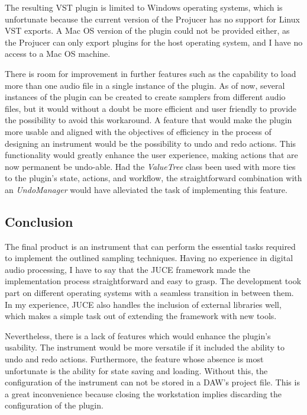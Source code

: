 \documentclass[12pt, a4paper, hidelinks]{article}
\begin{document}
	The resulting VST plugin is limited to Windows operating systems, which is unfortunate because the current version of the Projucer has no support for Linux VST exports. A Mac OS version of the plugin could not be provided either, as the Projucer can only export plugins for the host operating system, and I have no access to a Mac OS machine. \par
		
	There is room for improvement in further features such as the capability to load more than one audio file in a single instance of the plugin. As of now, several instances of the plugin can be created to create samplers from different audio files, but it would without a doubt be more efficient and user friendly to provide the possibility to avoid this workaround. A feature that would make the plugin more usable and aligned with the objectives of efficiency in the process of designing an instrument would be the possibility to undo and redo actions. This functionality would greatly enhance the user experience, making actions that are now permanent be undo-able. Had the \textit{ValueTree} class been used with more ties to the plugin's state, actions, and workflow, the straightforward combination with an \textit{UndoManager} would have alleviated the task of implementing this feature.\par 

	\newpage
	\subsection{Conclusion}
	The final product is an instrument that can perform the essential tasks required to implement the outlined sampling techniques.	Having no experience in digital audio processing, I have to say that the JUCE framework made the implementation process straightforward and easy to grasp. The development took part on different operating systems with a seamless transition in between them. In my experience, JUCE also handles the inclusion of external libraries well, which makes a simple task out of extending the framework with new tools.
	
	Nevertheless, there is a lack of features which would enhance the plugin's usability. The instrument would be more versatile if it included the ability to undo and redo actions. Furthermore, the feature whose absence is most unfortunate is the ability for state saving and loading. Without this, the configuration of the instrument can not be stored in a DAW's project file. This is a great inconvenience because closing the workstation implies discarding the configuration of the plugin.%
	
\end{document}

